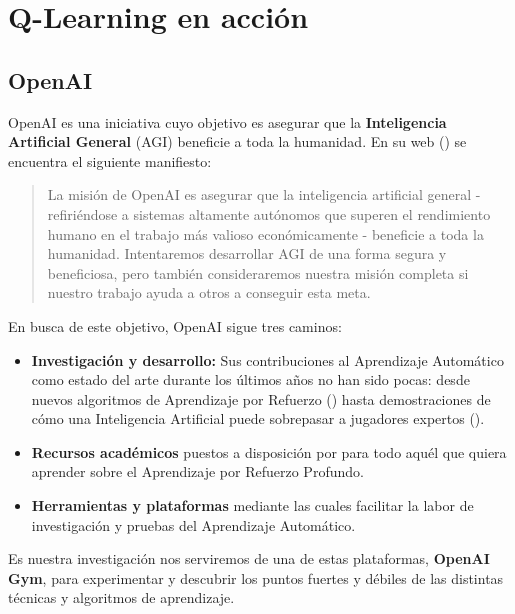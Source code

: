 \chapter{Q-Learning en acción}
\label{cap:q-learning}


\section{OpenAI}
OpenAI es una iniciativa cuyo objetivo es asegurar que la \textbf{Inteligencia Artificial General} (AGI) beneficie a toda la humanidad. En su web (\citet{OpenAI_charter}) se encuentra el siguiente manifiesto:

\begin{quote}
    La misión de OpenAI es asegurar que la inteligencia artificial general - refiriéndose a sistemas altamente autónomos que superen el rendimiento humano en el trabajo más valioso económicamente - beneficie a toda la humanidad. Intentaremos desarrollar AGI de una forma segura y beneficiosa, pero también consideraremos nuestra misión completa si nuestro trabajo ayuda a otros a conseguir esta meta. 
\end{quote}

En busca de este objetivo, OpenAI sigue tres caminos:
\begin{itemize}
    \item \textbf{Investigación y desarrollo:} Sus contribuciones al Aprendizaje Automático como estado del arte durante los últimos años no han sido pocas: desde nuevos algoritmos de Aprendizaje por Refuerzo (\citet{baselines}) hasta demostraciones de cómo una Inteligencia Artificial puede sobrepasar a jugadores expertos (\citet{OpenAI_dota}).
    \item \textbf{Recursos académicos} puestos a disposición por \citet{spinningup} para todo aquél que quiera aprender sobre el Aprendizaje por Refuerzo Profundo.
    \item \textbf{Herramientas y plataformas} mediante las cuales facilitar la labor de investigación y pruebas del Aprendizaje Automático.
\end{itemize}

Es nuestra investigación nos serviremos de una de estas plataformas, \textbf{OpenAI Gym}, para experimentar y descubrir los puntos fuertes y débiles de las distintas técnicas y algoritmos de aprendizaje.

